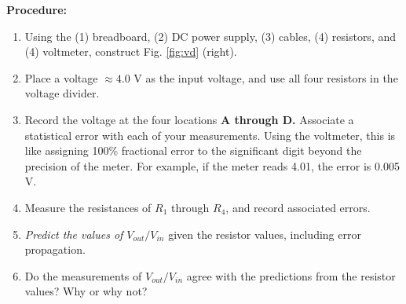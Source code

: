 \documentclass[12pt]{article}
\begin{document}
\textbf{Procedure:}

\begin{enumerate}
\item Using the (1) breadboard, (2) DC power supply, (3) cables, (4) resistors, and (4) voltmeter, construct Fig. \ref{fig:vd} (right).
\item Place a voltage $\approx 4.0$ V as the input voltage, and use all four resistors in the voltage divider.
\item Record the voltage at the four locations \textbf{A through D.}  Associate a statistical error with each of your measurements.  Using the voltmeter, this is like assigning 100\% fractional error to the significant digit beyond the precision of the meter.  For example, if the meter reads 4.01, the error is 0.005 V.
\item Measure the resistances of $R_1$ through $R_4$, and record associated errors.
\item \textit{Predict the values of $V_{out}/V_{in}$} given the resistor values, including error propagation.
\item Do the measurements of $V_{out}/V_{in}$ agree with the predictions from the resistor values?  Why or why not?
\end{enumerate}
\end{document}
